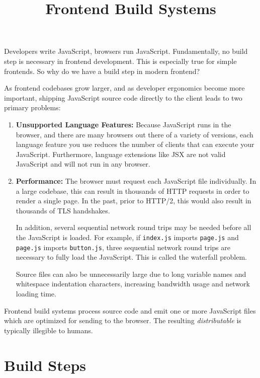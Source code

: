 \documentclass{article}
\title{Frontend Build Systems}
\begin{document}
\maketitle
\tableofcontents

Developers write JavaScript, browsers run JavaScript. Fundamentally, no build step is necessary in
frontend development. This is especially true for simple frontends. So why do we have a build step
in modern frontend?

As frontend codebases grow larger, and as developer ergonomics become more important, shipping
JavaScript source code directly to the client leads to two primary problems:

\begin{enumerate}
  \item \textbf{Unsupported Language Features:} Because JavaScript runs in the browser, and there
    are many browsers out there of a variety of versions, each language feature you use reduces the
    number of clients that can execute your JavaScript. Furthermore, language extensions like JSX
    are not valid JavaScript and will not run in any browser.

  \item \textbf{Performance:} The browser must request each JavaScript file individually. In a large
    codebase, this can result in thousands of HTTP requests in order to render a single page. In the
    past, prior to HTTP/2, this would also result in thousands of TLS handshakes.

    In addition, several sequential network round trips may be needed before all the JavaScript is
    loaded. For example, if \texttt{index.js} imports \texttt{page.js} and \texttt{page.js} imports
    \texttt{button.js}, three sequential network round trips are necessary to fully load the
    JavaScript. This is called the waterfall problem.

    Source files can also be unnecessarily large due to long variable names and whitespace
    indentation characters, increasing bandwidth usage and network loading time.
\end{enumerate}

Frontend build systems process source code and emit one or more JavaScript files which are optimized
for sending to the browser. The resulting \textit{distributable} is typically illegible to humans.

\section{Build Steps}
\end{document}
